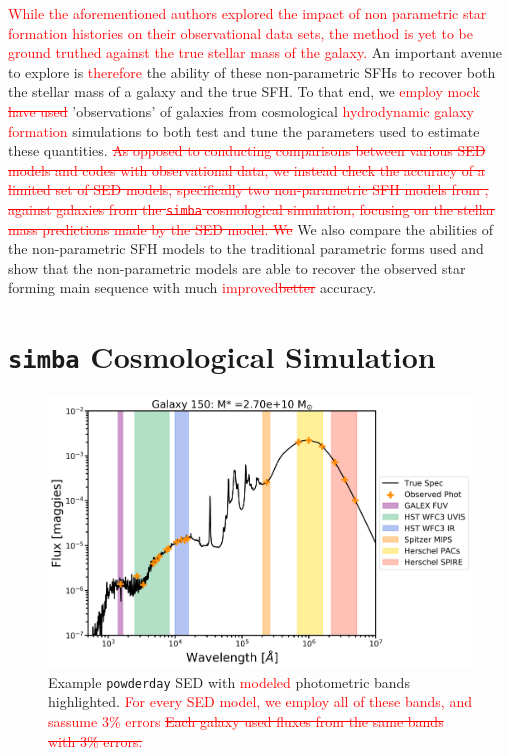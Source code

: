 \documentclass[twocolumn]{aastex62}
\newcommand{\red}[1]{{\textcolor{red}{#1}}}
\begin{document}
\red{While the aforementioned authors explored the impact of non parametric star formation histories on their observational data sets, the method is yet to be ground truthed against the true stellar mass of the galaxy.} An important avenue to explore is \red{therefore} the ability of these non-parametric SFHs to recover both the stellar mass of a galaxy and the true SFH. To that end, we \red{employ mock \sout{have used}} 'observations' of galaxies from cosmological \red{hydrodynamic galaxy formation} simulations to both test and tune the parameters used to estimate these quantities. \red{\sout{As opposed to conducting comparisons between various SED models and codes with observational data, we instead check the accuracy of a limited set of SED models, specifically two non-parametric SFH models from \cite{leja_how_2018}, against galaxies from the \texttt{simba} cosmological simulation, focusing on the stellar mass predictions made by the SED model. We}} We also compare the abilities of the non-parametric SFH models to the traditional parametric forms used and show that the non-parametric models are able to recover the observed star forming main sequence with much \red{improved\sout{better}} accuracy.   


\section{\texttt{simba} Cosmological Simulation} 
\label{section:simulations}

\begin{figure}
    \centering
    \includegraphics[width = \textwidth]{fancySED_150.png}
    \caption{Example \texttt{powderday} SED with \red{modeled} photometric bands highlighted. \red{For every SED model, we employ all of these bands, and sassume $3\%$ errors \sout{Each galaxy used fluxes from the same bands with 3\% errors.}} }
    \label{fig:SED}
\end{figure}
\end{document}
